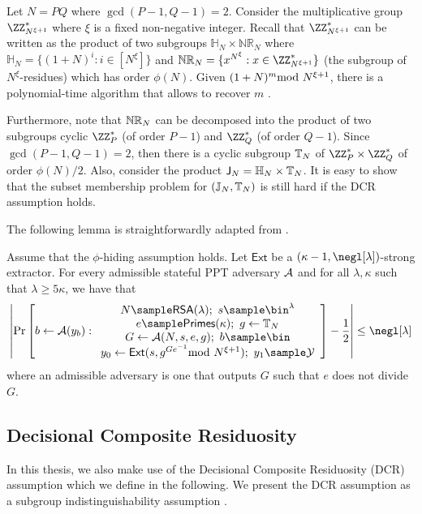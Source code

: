 Let $N=PQ$ where $\gcd(P-1,Q-1)=2$.  Consider the multiplicative group $\ZZ_{N^{\xi+1}}^*$ where $\xi$ is a fixed non-negative integer. Recall that  $\ZZ_{N^{\xi+1}}^*$ can be written as the product of two subgroups $\mathbb{H}_N\times \mathbb{NR}_N$ where $\mathbb{H}_N=\{(1+N)^i:i\in [N^\xi]\}$ and $\NR_N=\{x^{N^\xi}:x\in\ZZ_{N^{\xi+1}}^*\}$ (the subgroup of $N^\xi$-residues) which has order $\phi(N)$. Given $(1+N)^m\!\!\!\!\mod N^{\xi+1}$, there is a polynomial-time algorithm that allows to recover $m$ \cite{PKC:DamJur01}.

Furthermore, note that $\mathbb{NR}_N$ can be decomposed into the product of two subgroups cyclic $\ZZ_P^*$ (of order $P-1$) and $\ZZ_Q^*$ (of order $Q-1$). Since  $\gcd(P-1,Q-1)=2$, then there is a cyclic subgroup  $\mathbb{T}_N$ of $\ZZ_P^*\times\ZZ_Q^*$ of order $\phi(N)/2$. Also, consider the product $\mathsf{J}_N=\mathbb{H}_N\times \mathbb{T}_N$. It is easy to show that  the subset membership problem for $(\mathbb{J}_N, \mathbb{T}_N)$ is still hard if the DCR assumption holds. %


The following lemma is straightforwardly adapted from \cite{C:GoyVusWat20}.

\begin{lemma}
\label{lemma:phiext}
Assume that the $\phi$-hiding assumption holds. Let $\mathsf{Ext}$ be a $(\kappa-1,\negl[\lambda])$-strong extractor. For every admissible stateful PPT adversary $\mathcal{A}$ and for all $\lambda,\kappa$ such that $\lambda\geq 5\kappa$, we have that $$\left|\Pr\left[b\leftarrow\Ac(y_b):\begin{array}{c}
     N\sample \mathsf{RSA}(\lambda) ; \text{ } 
     s\sample\bin^\lambda \\
     e\sample \mathsf{Primes}(\kappa) ; \text{ } 
     g\leftarrow\TT_N\\
     G\leftarrow\Ac(N,s,e,g) ; \text{ }  
     b\sample \bin \\ 
     y_0\leftarrow\mathsf{Ext}(s,g^{G e^{-1}}\smod N^{\xi+1}) ; \text{ }  
     y_1\sample \Yc
\end{array}\right]-\frac{1}{2}\right|\leq \negl[\lambda]$$ where an admissible adversary is one that outputs $G$ such that $e$ does not divide $G$.
\end{lemma}

\subsection{Decisional Composite Residuosity}
In this thesis, we also make use of the Decisional Composite Residuosity (DCR) assumption which we define in the following. We present the DCR assumption as a subgroup indistinguishability assumption \cite{C:BraGol10}.

